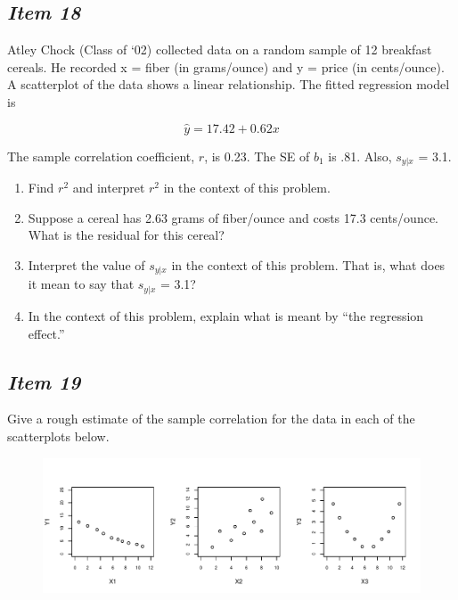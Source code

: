 \documentclass[twoside,openany]{tufte-book}
\begin{document}
\subsection{\textbf{\textit{Item 18}}}
Atley Chock (Class of `02) collected data on a random sample of 12 breakfast cereals.  He recorded x = fiber (in grams/ounce) and y = price (in cents/ounce).  A scatterplot of the data shows a linear relationship.  The fitted regression model is

\begin{equation*}
\hat{y} = 17.42 + 0.62x
\end{equation*}
  
The sample correlation coefficient, $r$, is 0.23.  The SE of $b_1$ is .81.   Also, $s_{y|x}$ = 3.1.
\begin{enumerate}[leftmargin=1cm, itemsep=.2em]
\item Find $r^2$ and interpret $r^2$ in the context of this problem.
\item Suppose a cereal has 2.63 grams of fiber/ounce and costs 17.3 cents/ounce.  What is the residual for this cereal?
\item Interpret the value of $s_{y|x}$ in the context of this problem.  That is, what does it mean to say that $s_{y|x}$ = 3.1?
\item In the context of this problem, explain what is meant by ``the regression effect.''
\end{enumerate}

\subsection{\textbf{\textit{Item 19}}}
Give a rough estimate of the sample correlation for the data in each of the scatterplots below.

\begin{figure}[ht]
\centering
\includegraphics[width=6.5in]{Item19_R.pdf}
\end{figure}

\newpage
\end{document}
